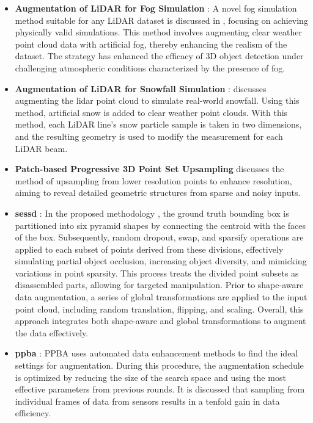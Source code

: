 \begin{itemize}
    \item \textbf{Augmentation of LiDAR for Fog Simulation} : A novel fog simulation method suitable for any LiDAR dataset is discussed in \parencite{fog_sim_2021}, focusing on achieving physically valid simulations. This method involves augmenting clear weather point cloud data with artificial fog, thereby enhancing the realism of the dataset. The strategy has enhanced the efficacy of 3D object detection under challenging atmospheric conditions characterized by the presence of fog.
    \item \textbf{Augmentation of LiDAR for Snowfall Simulation} :\parencite{snow_sim_2022} discusses augmenting the lidar point cloud to simulate real-world snowfall. Using this method, artificial snow is added to clear weather point clouds. With this method, each LiDAR line's snow particle sample is taken in two dimensions, and the resulting geometry is used to modify the measurement for each LiDAR beam.
    \item \textbf{Patch-based Progressive 3D Point Set Upsampling} \parencite{patched_up_2018} discusses the method of upsampling from lower resolution points to enhance resolution, aiming to reveal detailed geometric structures from sparse and noisy inputs.
    \item \textbf{\acrfull{sessd}} : In the proposed methodology \parencite{sessd_2021}, the ground truth bounding box is partitioned into six pyramid shapes by connecting the centroid with the faces of the box. Subsequently, random dropout, swap, and sparsify operations are applied to each subset of points derived from these divisions, effectively simulating partial object occlusion, increasing object diversity, and mimicking variations in point sparsity. This process treats the divided point subsets as disassembled parts, allowing for targeted manipulation. Prior to shape-aware data augmentation, a series of global transformations are applied to the input point cloud, including random translation, flipping, and scaling. Overall, this approach integrates both shape-aware and global transformations to augment the data effectively.
    \item \textbf{\acrfull{ppba}} : PPBA \parencite{ppba_2020} uses automated data enhancement methods to find the ideal settings for augmentation. During this procedure, the augmentation schedule is optimized by reducing the size of the search space and using the most effective parameters from previous rounds. It is discussed that sampling from individual frames of data from sensors results in a tenfold gain in data efficiency.

\end{itemize}
